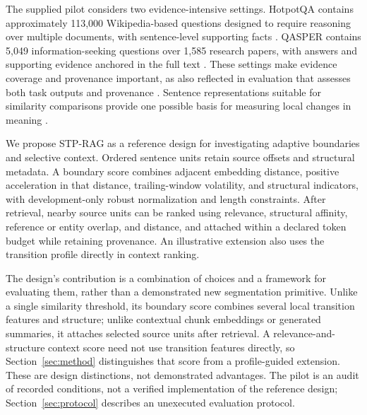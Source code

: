 \documentclass[10pt]{article}
\begin{document}
The supplied pilot considers two evidence-intensive settings. HotpotQA contains approximately 113,000 Wikipedia-based questions designed to require reasoning over multiple documents, with sentence-level supporting facts \cite{Yang2018HotpotqaDataset}. QASPER contains 5,049 information-seeking questions over 1,585 research papers, with answers and supporting evidence anchored in the full text \cite{Dasigi2021DatasetInformationseeking}. These settings make evidence coverage and provenance important, as also reflected in evaluation that assesses both task outputs and provenance \cite{Petroni2020KiltBenchmark}. Sentence representations suitable for similarity comparisons provide one possible basis for measuring local changes in meaning \cite{Reimers2019SentencebertSentence}.

We propose STP-RAG as a reference design for investigating adaptive boundaries and selective context. Ordered sentence units retain source offsets and structural metadata. A boundary score combines adjacent embedding distance, positive acceleration in that distance, trailing-window volatility, and structural indicators, with development-only robust normalization and length constraints. After retrieval, nearby source units can be ranked using relevance, structural affinity, reference or entity overlap, and distance, and attached within a declared token budget while retaining provenance. An illustrative extension also uses the transition profile directly in context ranking.

The design's contribution is a combination of choices and a framework for evaluating them, rather than a demonstrated new segmentation primitive. Unlike a single similarity threshold, its boundary score combines several local transition features and structure; unlike contextual chunk embeddings or generated summaries, it attaches selected source units after retrieval. A relevance-and-structure context score need not use transition features directly, so Section~\ref{sec:method} distinguishes that score from a profile-guided extension. These are design distinctions, not demonstrated advantages. The pilot is an audit of recorded conditions, not a verified implementation of the reference design; Section~\ref{sec:protocol} describes an unexecuted evaluation protocol.
\end{document}
